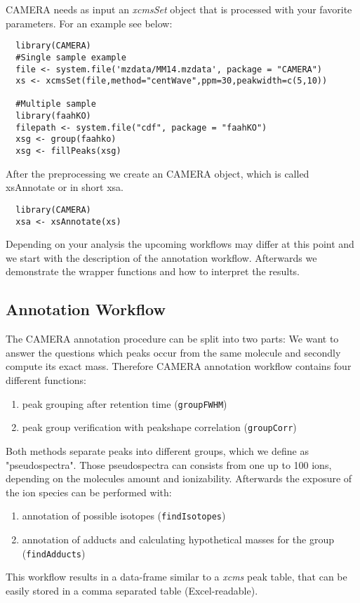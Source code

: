 \documentclass[a4paper,12pt]{article}
\newcommand{\Rfunction}[1]{{\texttt{#1}}}
\newcommand{\Rpackage}[1]{{\textit{#1}}}
\newcommand{\Rclass}[1]{{\textit{#1}}}
\begin{document}
CAMERA needs as input an \Rclass{xcmsSet} object that is processed with your
favorite parameters. For an example see below:
\begin{verbatim}
  library(CAMERA)
  #Single sample example
  file <- system.file('mzdata/MM14.mzdata', package = "CAMERA")
  xs <- xcmsSet(file,method="centWave",ppm=30,peakwidth=c(5,10))

  #Multiple sample
  library(faahKO)
  filepath <- system.file("cdf", package = "faahKO")
  xsg <- group(faahko)
  xsg <- fillPeaks(xsg)
\end{verbatim}

After the preprocessing we create an CAMERA object, which is called xsAnnotate
or in short xsa. 
\begin{verbatim}
  library(CAMERA)
  xsa <- xsAnnotate(xs)
\end{verbatim}
Depending on your analysis the upcoming workflows may differ at this point and
we start with the description of the annotation workflow. Afterwards we
demonstrate the wrapper functions and how to interpret the results.


\subsection{Annotation Workflow}

The CAMERA annotation procedure can be split into two parts: We want to
answer the questions which peaks occur from the same molecule and
secondly compute its exact mass. Therefore CAMERA annotation workflow contains
four different functions:
\begin{enumerate}
 \item peak grouping after retention time (\Rfunction{groupFWHM})
 \item peak group verification with peakshape correlation
(\Rfunction{groupCorr})
\end{enumerate}
Both methods separate peaks into different groups, which we define as
"pseudospectra". Those pseudospectra can consists from one up to 100 ions,
depending on the molecules amount and ionizability.
Afterwards the exposure of the ion species can be performed with:
\begin{enumerate}
 \item annotation of possible isotopes (\Rfunction{findIsotopes})
 \item annotation of adducts and calculating hypothetical masses for the group
(\Rfunction{findAdducts})
\end{enumerate}
This workflow results in a data-frame similar to a \Rpackage{xcms} peak table,
that can be easily stored in a comma separated table
(Excel-readable).
\end{document}
